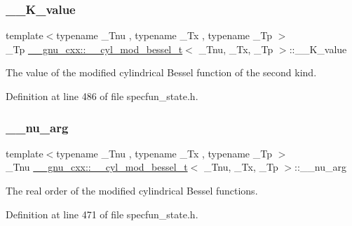 \subsubsection{\texorpdfstring{\+\_\+\+\_\+\+K\+\_\+value}{\_\_K\_value}}
{\footnotesize\ttfamily template$<$typename \+\_\+\+Tnu , typename \+\_\+\+Tx , typename \+\_\+\+Tp $>$ \\
\+\_\+\+Tp \hyperlink{struct____gnu__cxx_1_1____cyl__mod__bessel__t}{\+\_\+\+\_\+gnu\+\_\+cxx\+::\+\_\+\+\_\+cyl\+\_\+mod\+\_\+bessel\+\_\+t}$<$ \+\_\+\+Tnu, \+\_\+\+Tx, \+\_\+\+Tp $>$\+::\+\_\+\+\_\+\+K\+\_\+value}



The value of the modified cylindrical Bessel function of the second kind. 



Definition at line 486 of file specfun\+\_\+state.\+h.

\mbox{\label{struct____gnu__cxx_1_1____cyl__mod__bessel__t_a482597cb5cc7de3449debeb0a451a757}} 
\subsubsection{\texorpdfstring{\+\_\+\+\_\+nu\+\_\+arg}{\_\_nu\_arg}}
{\footnotesize\ttfamily template$<$typename \+\_\+\+Tnu , typename \+\_\+\+Tx , typename \+\_\+\+Tp $>$ \\
\+\_\+\+Tnu \hyperlink{struct____gnu__cxx_1_1____cyl__mod__bessel__t}{\+\_\+\+\_\+gnu\+\_\+cxx\+::\+\_\+\+\_\+cyl\+\_\+mod\+\_\+bessel\+\_\+t}$<$ \+\_\+\+Tnu, \+\_\+\+Tx, \+\_\+\+Tp $>$\+::\+\_\+\+\_\+nu\+\_\+arg}



The real order of the modified cylindrical Bessel functions. 



Definition at line 471 of file specfun\+\_\+state.\+h.

\mbox{\label{struct____gnu__cxx_1_1____cyl__mod__bessel__t_ad23dcffe64b074804b84abe4d0da7515}} 
